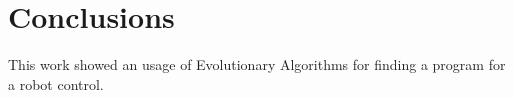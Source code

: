 \documentclass{ExcelAtFIT}
\begin{document}

\section{Conclusions}
\label{sec:Conclusions}

This work showed an usage of Evolutionary Algorithms for finding a program for a robot control.





\end{document}
